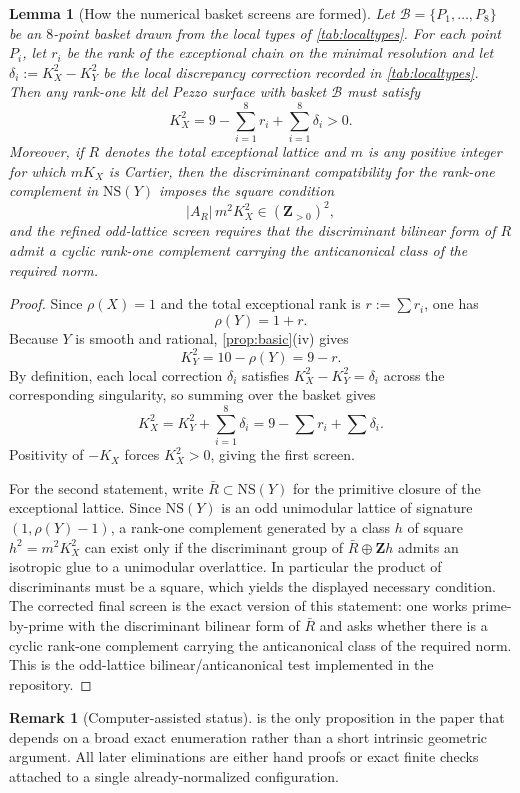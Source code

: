 \documentclass[11pt]{article}
\newtheorem{lemma}[lemma]{Lemma}
\theoremstyle{definition}
\newtheorem{remark}[remark]{Remark}
\newcommand{\NS}{\mathrm{NS}}
\begin{document}
\begin{lemma}[How the numerical basket screens are formed]\label{lem:basket-screens}
Let $\mathcal B=\{P_1,\dots,P_8\}$ be an $8$-point basket drawn from the local types of \cref{tab:localtypes}. For each point $P_i$, let $r_i$ be the rank of the exceptional chain on the minimal resolution and let $\delta_i:=K_X^2-K_Y^2$ be the local discrepancy correction recorded in \cref{tab:localtypes}. Then any rank-one klt del Pezzo surface with basket $\mathcal B$ must satisfy
\[
K_X^2 = 9-\sum_{i=1}^8 r_i + \sum_{i=1}^8 \delta_i > 0.
\]
Moreover, if $R$ denotes the total exceptional lattice and $m$ is any positive integer for which $mK_X$ is Cartier, then the discriminant compatibility for the rank-one complement in $\NS(Y)$ imposes the square condition
\[
|A_R|\,m^2K_X^2\in (\mathbf Z_{>0})^2,
\]
and the refined odd-lattice screen requires that the discriminant bilinear form of $R$ admit a cyclic rank-one complement carrying the anticanonical class of the required norm.
\end{lemma}

\begin{proof}
Since $\rho(X)=1$ and the total exceptional rank is $r:=\sum r_i$, one has
\[
\rho(Y)=1+r.
\]
Because $Y$ is smooth and rational, \cref{prop:basic}(iv) gives
\[
K_Y^2 = 10-\rho(Y)=9-r.
\]
By definition, each local correction $\delta_i$ satisfies $K_X^2-K_Y^2=\delta_i$ across the corresponding singularity, so summing over the basket gives
\[
K_X^2 = K_Y^2+\sum_{i=1}^8 \delta_i = 9-\sum r_i+\sum \delta_i.
\]
Positivity of $-K_X$ forces $K_X^2>0$, giving the first screen.

For the second statement, write $\bar R\subset \NS(Y)$ for the primitive closure of the exceptional lattice. Since $\NS(Y)$ is an odd unimodular lattice of signature $(1,\rho(Y)-1)$, a rank-one complement generated by a class $h$ of square $h^2=m^2K_X^2$ can exist only if the discriminant group of $\bar R\oplus \mathbf Zh$ admits an isotropic glue to a unimodular overlattice. In particular the product of discriminants must be a square, which yields the displayed necessary condition. The corrected final screen is the exact version of this statement: one works prime-by-prime with the discriminant bilinear form of $\bar R$ and asks whether there is a cyclic rank-one complement carrying the anticanonical class of the required norm. This is the odd-lattice bilinear/anticanonical test implemented in the repository.
\end{proof}

\begin{remark}[Computer-assisted status]\label{rem:computer-assisted}
 is the only proposition in the paper that depends on a broad exact enumeration rather than a short intrinsic geometric argument. All later eliminations are either hand proofs or exact finite checks attached to a single already-normalized configuration.
\end{remark}
\end{document}

